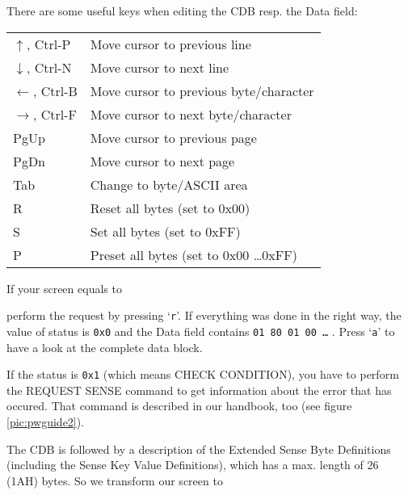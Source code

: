 \begin{note}
  There are some useful keys when editing the CDB resp. the Data field:

  \begin{tabular}{ll}
    $\uparrow$,    Ctrl-P & Move cursor to previous line                 \\
    $\downarrow$,  Ctrl-N & Move cursor to next line                     \\
    $\leftarrow$,  Ctrl-B & Move cursor to previous byte\slash character \\
    $\rightarrow$, Ctrl-F & Move cursor to next byte\slash character     \\
    PgUp                  & Move cursor to previous page                 \\
    PgDn                  & Move cursor to next page                     \\
    Tab                   & Change to byte/ASCII area                    \\
    R                     & Reset all bytes  (set to 0x00)               \\
    S                     & Set all bytes    (set to 0xFF)               \\
    P                     & Preset all bytes (set to 0x00 \ldots 0xFF)   \\
  \end{tabular}

\end{note}

If your screen equals to



perform the request by pressing `{\tt r}'.
If everything was done in the right way, the value of status is {\tt 0x0} and
the Data field contains {\tt 01 80 01 00 \ldots} . Press `{\tt a}' to have a
look at the complete data block.



If the status is {\tt 0x1} (which means CHECK CONDITION), you have to perform
the REQUEST SENSE command to get information about the error that has occured.
That command is described in our handbook, too (see figure
\ref{pic:pwguide2}).



The CDB is followed by a description of the Extended Sense Byte Definitions
(including the Sense Key Value Definitions), which has a max. length of 26
(1AH) bytes. So we transform our screen to



